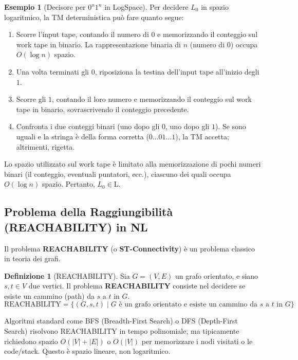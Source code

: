 \documentclass[a4paper]{article}
\theoremstyle{definition} %
\newtheorem{definition}{Definizione}[section]
\newtheorem{example}{Esempio}[section]
\begin{document}
\begin{example}[Decisore per $0^n1^n$ in LogSpace]
Per decidere $L_0$ in spazio logaritmico, la TM deterministica può fare quanto segue:
\begin{enumerate}
    \item Scorre l'input tape, contando il numero di $0$ e memorizzando il conteggio sul work tape in binario. La rappresentazione binaria di $n$ (numero di $0$) occupa $O(\log n)$ spazio.
    \item Una volta terminati gli $0$, riposiziona la testina dell'input tape all'inizio degli $1$.
    \item Scorre gli $1$, contando il loro numero e memorizzando il conteggio sul work tape in binario, sovrascrivendo il conteggio precedente.
    \item Confronta i due conteggi binari (uno dopo gli $0$, uno dopo gli $1$). Se sono uguali e la stringa è della forma corretta ($0...01...1$), la TM accetta; altrimenti, rigetta.
\end{enumerate}
Lo spazio utilizzato sul work tape è limitato alla memorizzazione di pochi numeri binari (il conteggio, eventuali puntatori, ecc.), ciascuno dei quali occupa $O(\log n)$ spazio. Pertanto, $L_0 \in \text{L}$.
\end{example}

\subsection{Problema della Raggiungibilità (REACHABILITY) in NL}

Il problema \textbf{REACHABILITY} (o \textbf{ST-Connectivity}) è un problema classico in teoria dei grafi.

\begin{definition}[REACHABILITY]
Sia $G=(V,E)$ un grafo orientato, e siano $s, t \in V$ due vertici. Il problema \textbf{REACHABILITY} consiste nel decidere se esiste un cammino (path) da $s$ a $t$ in $G$.
\[ \text{REACHABILITY} = \{ (G, s, t) \mid G \text{ è un grafo orientato e esiste un cammino da } s \text{ a } t \text{ in } G \} \]
\end{definition}

Algoritmi standard come BFS (Breadth-First Search) o DFS (Depth-First Search) risolvono REACHABILITY in tempo polinomiale, ma tipicamente richiedono spazio $O(|V| + |E|)$ o $O(|V|)$ per memorizzare i nodi visitati o le code/stack. Questo è spazio lineare, non logaritmico.
\end{document}
